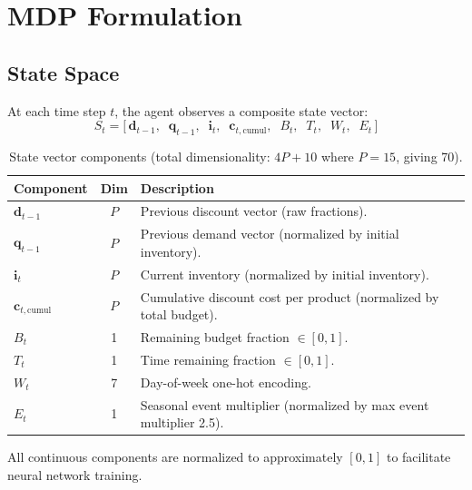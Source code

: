\documentclass[11pt,a4paper]{article}
\begin{document}
\section{MDP Formulation}
\label{sec:mdp}

\subsection{State Space}

At each time step $t$, the agent observes a composite state vector:
\begin{equation}
\boxed{
S_t = \bigl[\,\mathbf{d}_{t-1},\;\; \mathbf{q}_{t-1},\;\; \mathbf{i}_t,\;\; \mathbf{c}_{t,\text{cumul}},\;\; B_t,\;\; T_t,\;\; W_t,\;\; E_t\,\bigr]
}
\end{equation}

\begin{table}[H]
\centering
\caption{State vector components (total dimensionality: $4P + 10$ where $P=15$, giving 70).}
\begin{tabular}{@{}lcl@{}}
\toprule
\textbf{Component} & \textbf{Dim} & \textbf{Description} \\
\midrule
$\mathbf{d}_{t-1}$ & $P$ & Previous discount vector (raw fractions). \\
$\mathbf{q}_{t-1}$ & $P$ & Previous demand vector (normalized by initial inventory). \\
$\mathbf{i}_t$ & $P$ & Current inventory (normalized by initial inventory). \\
$\mathbf{c}_{t,\text{cumul}}$ & $P$ & Cumulative discount cost per product (normalized by total budget). \\
$B_t$ & 1 & Remaining budget fraction $\in [0, 1]$. \\
$T_t$ & 1 & Time remaining fraction $\in [0, 1]$. \\
$W_t$ & 7 & Day-of-week one-hot encoding. \\
$E_t$ & 1 & Seasonal event multiplier (normalized by max event multiplier 2.5). \\
\bottomrule
\end{tabular}
\end{table}

All continuous components are normalized to approximately $[0, 1]$ to facilitate neural network training.
\end{document}
